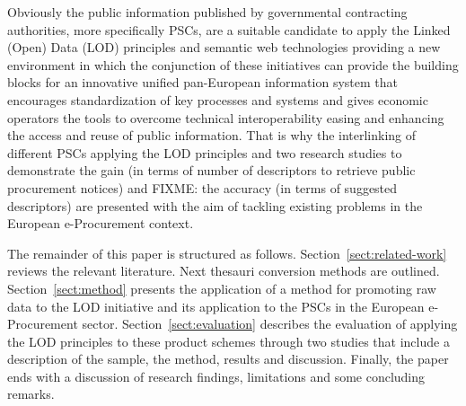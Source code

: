 Obviously the public information published by governmental contracting authorities, more specifically PSCs, are a suitable candidate to apply the Linked (Open) Data 
(LOD) principles and semantic web technologies providing a new environment in which the conjunction of these initiatives can provide the building blocks for an 
innovative unified pan-European information system that encourages standardization of key processes and systems and gives economic operators the tools to overcome 
technical interoperability easing and enhancing the access and reuse of public information. That is why the interlinking of different PSCs applying the LOD principles and two 
research studies to demonstrate the gain (in terms of number of descriptors to retrieve public procurement notices) and FIXME: the accuracy (in terms of suggested descriptors) 
are presented with the aim of tackling existing problems in the European e-Procurement context. 


The remainder of this paper is structured as follows. Section~\ref{sect:related-work} reviews the relevant literature. Next thesauri 
conversion methods are outlined. Section~\ref{sect:method} presents the application of a method for promoting raw data to the LOD initiative 
and its application to the PSCs in the European e-Procurement sector. Section~\ref{sect:evaluation} describes the evaluation of applying the LOD principles to 
these product schemes through two studies that include a description of the sample, the method, results and discussion. Finally, 
the paper ends with a discussion of research findings, limitations and some concluding remarks.
